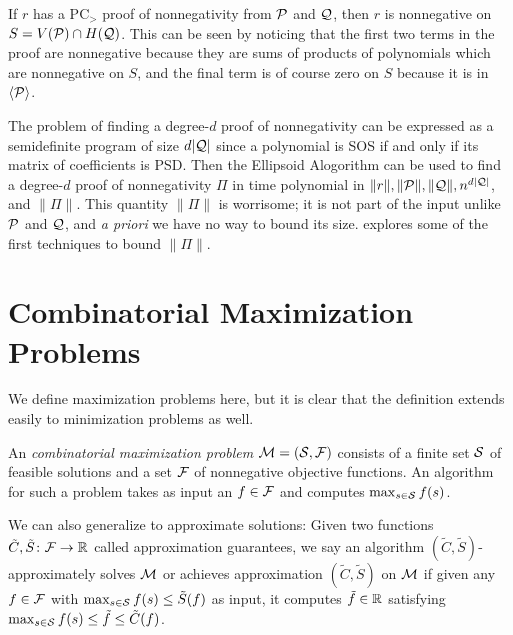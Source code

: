 If $r$ has a PC$_>$ proof of nonnegativity from $\mathcal P$ and $\mathcal Q$, then $r$ is nonnegative on $S = V(\mathcal P) \cap H(\mathcal Q)$. This can be seen by noticing that the first two terms in the proof are nonnegative because they are sums of products of polynomials which are nonnegative on $S$, and the final term is of course zero on $S$ because it is in $\langle \mathcal P \rangle$. 

The problem of finding a degree-$d$ proof of nonnegativity can be expressed as a semidefinite program of size $d|\mathcal Q|$ since a polynomial is SOS if and only if its matrix of coefficients is PSD. Then the Ellipsoid Alogorithm can be used to find a degree-$d$ proof of nonnegativity $\Pi$ in time polynomial in $\|r\|, \|\mathcal P\|, \|\mathcal Q\|, n^{d|\mathcal Q|}$, and $\|\Pi\|$. This quantity $\|\Pi\|$ is worrisome; it is not part of the input unlike $\mathcal P$ and $\mathcal Q$, and \emph{a priori} we have no way to bound its size.  explores some of the first techniques to bound $\|\Pi\|$.

\section{Combinatorial Maximization Problems}
We define maximization problems here, but it is clear that the definition extends easily to minimization problems as well.
\begin{definition}
An \emph{combinatorial maximization problem} \(\mathcal M = (\mathcal S, \mathcal F)\)
consists of a finite set
\(\mathcal S\) of feasible solutions and a set \(\mathcal F\) of nonnegative
objective functions. An algorithm for such a problem takes as input an $f \in \mathcal F$ and computes
$\max_{s \in \mathcal S} f(s)$.

We can also generalize to approximate solutions: Given two functions \(\tilde{C}, \tilde{S} \colon \mathcal F \rightarrow \mathbb R\)
called approximation guarantees, we say
an algorithm \((\tilde{C}, \tilde{S})\)-approximately solves \(\mathcal M\) or achieves approximation $(\tilde{C}, \tilde{S})$ on $\mathcal M$
if given any \(f \in \mathcal F\) with \(\max_{s \in \mathcal S} f(s) \leq \tilde{S}(f)\) as input,
it computes \(\tilde{f}\in \mathbb R\) satisfying
\(\max_{s \in \mathcal S} f(s) \leq \tilde{f} \leq \tilde{C}(f)\).
\end{definition}

